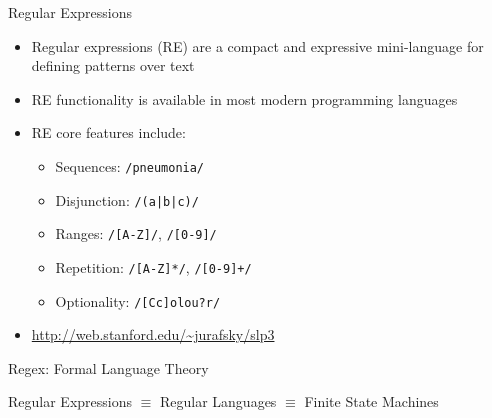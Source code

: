 \documentclass[10pt]{beamer}
\begin{document}
\begin{frame}{Regular Expressions}
\begin{itemize}
  \item \alert{Regular expressions} (RE) are a compact and expressive mini-language for defining \alert{patterns} over text
  \item RE functionality is available in most modern programming languages
  \item RE core features include:
  \begin{itemize}
    \item Sequences: \texttt{/pneumonia/}
    \item Disjunction: \texttt{/(a|b|c)/}
    \item Ranges: \texttt{/[A-Z]/}, \texttt{/[0-9]/}
    \item Repetition: \texttt{/[A-Z]*/}, \texttt{/[0-9]+/}
    \item Optionality: \texttt{/[Cc]olou?r/}
  \end{itemize}
  \item \textcolor{blue}{\url{http://web.stanford.edu/~jurafsky/slp3}}
\end{itemize}
\end{frame}

\begin{frame}{Regex: Formal Language Theory}
  \begin{center}
  \end{center}
  \alert{Regular Expressions} $\equiv$ \alert{Regular Languages} $\equiv$ \alert{Finite State Machines}
\end{frame}
\end{document}
